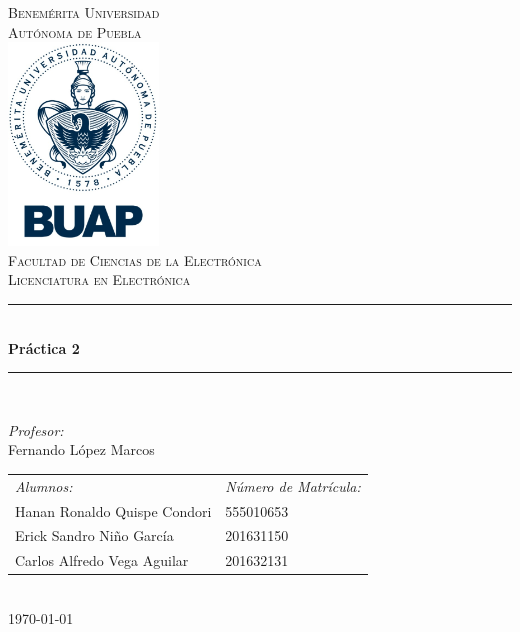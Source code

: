 \documentclass[12pt]{article}
\date{\today}
\begin{document}
\begin{titlepage}
\newcommand{\HRule}{\rule{\linewidth}{0.5mm}} 
\center
\textsc{\LARGE  Benemérita Universidad \\[0.2cm] Autónoma de Puebla}\\[1.5cm] 
\includegraphics[width=4cm]{imagenes/escudo.jpg}\\[1cm]
\textsc{\Large Facultad de Ciencias de la Electrónica}\\[0.5cm] 
\textsc{\large Licenciatura en Electrónica}\\[0.5cm]
\HRule \\[0.4cm]
{ \huge \bfseries Práctica 2}\\[0.4cm] 
\HRule \\[1.5cm]
\begin{minipage}{\textwidth}
\center 

\emph{Profesor:} \\
Fernando López Marcos \\[1cm]

\begin{tabular}{ll}
\emph{Alumnos:} & \emph{Número de Matrícula:}\\
Hanan Ronaldo Quispe Condori  & 555010653 \\
Erick Sandro Niño García & 201631150\\
Carlos Alfredo Vega Aguilar & 201632131 \\
\end{tabular}
\end{minipage}\\[2cm]
\today
\end{titlepage}



\end{document}
